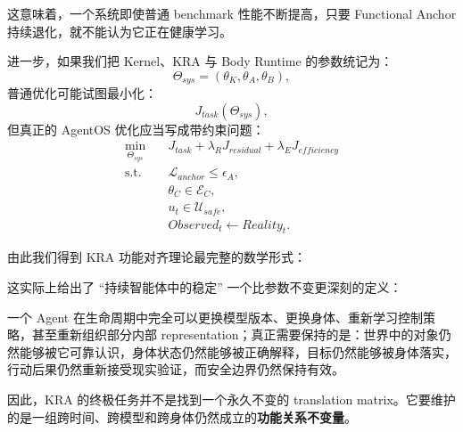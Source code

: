 这意味着，一个系统即使普通 benchmark 性能不断提高，只要 Functional Anchor 持续退化，就不能认为它正在健康学习。

进一步，如果我们把 Kernel、KRA 与 Body Runtime 的参数统记为：
\[
\Theta_{sys}
=
(\theta_K,\theta_A,\theta_B),
\]
普通优化可能试图最小化：
\[
J_{task}(\Theta_{sys}),
\]
但真正的 AgentOS 优化应当写成带约束问题：
\[
\begin{aligned}
\min_{\Theta_{sys}}\quad
&J_{task}
+
\lambda_RJ_{residual}
+
\lambda_EJ_{efficiency}\\
\text{s.t.}\quad
&\mathcal L_{anchor}\le\epsilon_A,\\
&\theta_C\in\mathcal E_C,\\
&u_t\in\mathcal U_{safe},\\
&Observed_t\leftarrow Reality_t.
\end{aligned}
\]

由此我们得到 KRA 功能对齐理论最完整的数学形式：

\begin{statementbox}
\centering
{}
\end{statementbox}

这实际上给出了 ``持续智能体中的稳定'' 一个比参数不变更深刻的定义：

\begin{statementbox}
\centering
{}
\end{statementbox}

一个 Agent 在生命周期中完全可以更换模型版本、更换身体、重新学习控制策略，甚至重新组织部分内部 representation；真正需要保持的是：世界中的对象仍然能够被它可靠认识，身体状态仍然能够被正确解释，目标仍然能够被身体落实，行动后果仍然重新接受现实验证，而安全边界仍然保持有效。

因此，KRA 的终极任务并不是找到一个永久不变的 translation matrix。它要维护的是一组跨时间、跨模型和跨身体仍然成立的\textbf{功能关系不变量}。

